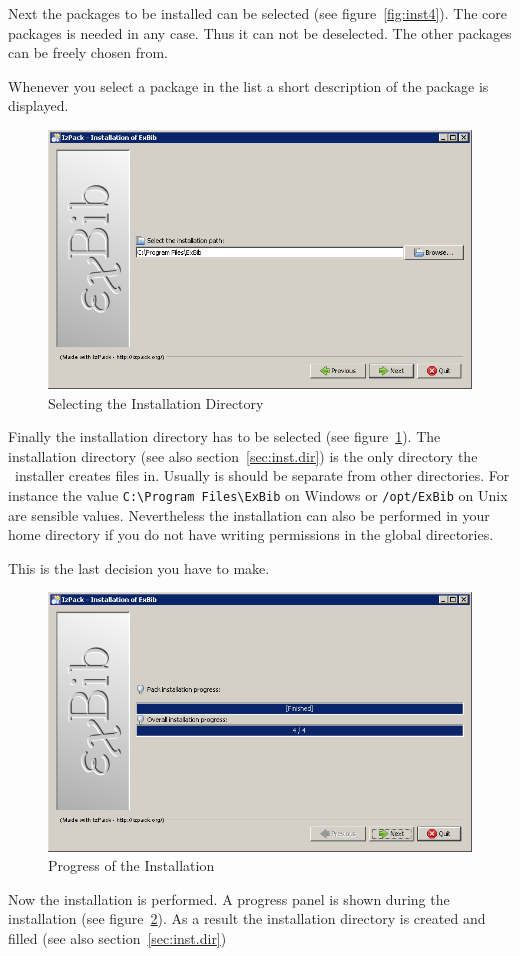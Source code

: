 Next the packages to be installed can be selected (see
figure~\ref{fig:inst4}). The core packages is needed in any case. Thus
it can not be deselected. The other packages can be freely chosen
from.

Whenever you select a package in the list a short description of the
package is displayed.

\begin{figure}[!ht]
  \centering
  \includegraphics[width=.45\textwidth]{img/inst6}
  \caption{Selecting the Installation Directory}
  \label{fig:inst5}
\end{figure}

Finally the installation directory has to be selected (see
figure~\ref{fig:inst5}). The installation directory (see also
section~\ref{sec:inst.dir}) is the only directory the \ExBib\ 
installer creates files in. Usually is should be separate from other
directories. For instance the value \verb|C:\Program Files\ExBib| on
Windows\index{Windows} or \verb|/opt/ExBib| on Unix\index{Unix} are
sensible values. Nevertheless the installation can also be performed
in your home directory if you do not have writing permissions in the
global directories.

This is the last decision you have to make.

\begin{figure}[!ht]
  \centering
  \includegraphics[width=.45\textwidth]{img/inst7}
  \caption{Progress of the Installation}
  \label{fig:inst6}
\end{figure}

Now the installation is performed. A progress panel is shown during
the installation (see figure~\ref{fig:inst6}). As a result the
installation directory is created and filled (see also
section~\ref{sec:inst.dir})

